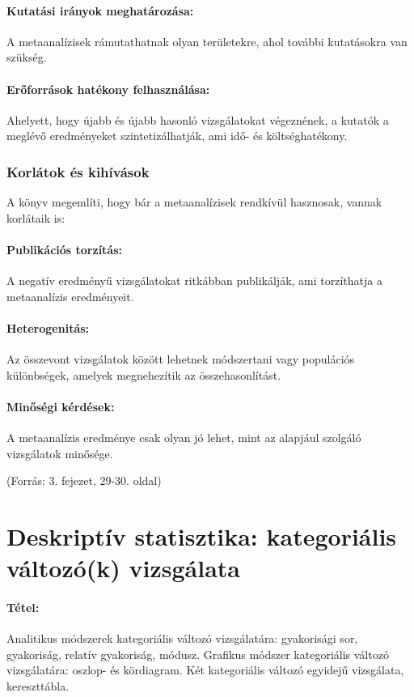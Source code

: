 \documentclass[a4paper,12pt]{article}
\begin{document}
    \paragraph{Kutatási irányok meghatározása:}
    A metaanalízisek rámutathatnak olyan területekre, ahol további kutatásokra van szükség.

    \paragraph{Erőforrások hatékony felhasználása:}
    Ahelyett, hogy újabb és újabb hasonló vizsgálatokat végeznének, a kutatók a meglévő eredményeket szintetizálhatják, ami idő- és költséghatékony.

    \subsubsection{Korlátok és kihívások}
    A könyv megemlíti, hogy bár a metaanalízisek rendkívül hasznosak, vannak korlátaik is:

    \paragraph{Publikációs torzítás:}
    A negatív eredményű vizsgálatokat ritkábban publikálják, ami torzíthatja a metaanalízis eredményeit.

    \paragraph{Heterogenitás:}
    Az összevont vizsgálatok között lehetnek módszertani vagy populációs különbségek, amelyek megnehezítik az összehasonlítást.

    \paragraph{Minőségi kérdések:}
    A metaanalízis eredménye csak olyan jó lehet, mint az alapjául szolgáló vizsgálatok minősége.

    (Forrás: 3. fejezet, 29-30. oldal)

    \newpage

\section{Deskriptív statisztika: kategoriális változó(k) vizsgálata}

\paragraph{Tétel:} Analitikus módszerek kategoriális változó vizsgálatára: gyakorisági sor, gyakoriság, relatív
gyakoriság, módusz. Grafikus módszer kategoriális változó vizsgálatára: oszlop- és
kördiagram. Két kategoriális változó egyidejű vizsgálata, kereszttábla.
\end{document}
